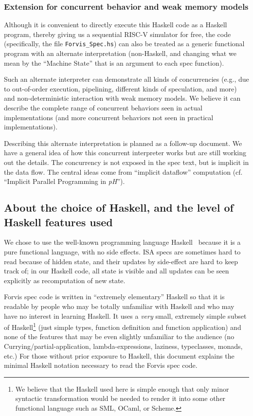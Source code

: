 \documentclass[11pt]{article}
\begin{document}

\subsubsection{Extension for concurrent behavior and weak memory models}

Although it is convenient to directly execute this Haskell code as a
Haskell program, thereby giving us a sequential RISC-V simulator for
free, the code (specifically, the file \verb|Forvis_Spec.hs|) can also
be treated as a generic functional program with an alternate
interpretation (non-Haskell, and changing what we mean by the
``Machine State'' that is an argument to each spec function).

Such an alternate interpreter can demonstrate all kinds of
concurrencies (e.g., due to out-of-order execution, pipelining,
different kinds of speculation, and more) and non-deterministic
interaction with weak memory models.  We believe it can describe the
complete range of concurrent behaviors seen in actual implementations
(and more concurrent behaviors not seen in practical implementations).

Describing this alternate interpretation is planned as a follow-up
document.  We have a general idea of how this concurrent interpreter
works but are still working out the details.  The concurrency is not
exposed in the spec text, but is implicit in the data flow.  The
central ideas come from ``implicit dataflow'' computation (cf.
``Implicit Parallel Programming in \emph{pH}''\cite{Nikhil2000a}).


\subsection{About the choice of Haskell, and the level of Haskell features used}

We chose to use the well-known programming language
Haskell~\cite{PeytonJones2003} because it is a pure functional
language, with no side effects.  ISA specs are sometimes hard to read
because of hidden state, and their updates by side-effect are hard to
keep track of; in our Haskell code, all state is visible and all
updates can be seen explicitly as recomputation of new state.

Forvis spec code is written in ``extremely elementary'' Haskell so
that it is readable by people who may be totally unfamiliar with
Haskell and who may have no interest in learning Haskell.  It uses a
\emph{very} small, extremely simple subset of Haskell\footnote{ We
believe that the Haskell used here is simple enough that only minor
syntactic transformation would be needed to render it into some other
functional language such as SML, OCaml, or Scheme.}  (just simple
types, function definition and function application) and none of the
features that may be even slightly unfamiliar to the audience (no
Currying/partial-application, lambda-expressions, laziness,
typeclasses, monads, etc.)  For those without prior exposure to
Haskell, this document explains the minimal Haskell notation necessary
to read the Forvis spec code.
\end{document}
